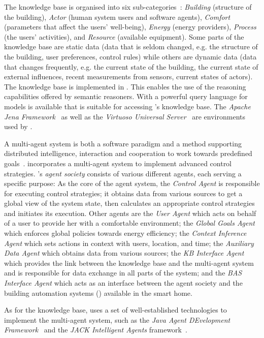 The knowledge base is organised into six sub-categories~\cite{CR2011-TH_Journal,CR2010-DEST_ThinkHome}: \emph{Building} (structure of the building), \emph{Actor} (human system users and software agents), \emph{Comfort} (parameters that affect the users' well-being), \emph{Energy} (energy providers), \emph{Process} (the users' activities), and \emph{Resource} (available equipment). Some parts of the knowledge base are static data (data that is seldom changed, e.g. the structure of the building, user preferences, control rules) while others are dynamic data (data that changes frequently, e.g. the current state of the building, the current state of external influences, recent measurements from sensors, current states of actors). The knowledge base is implemented in . This enables the use of the reasoning capabilities offered by semantic reasoners. With  a powerful query language for  models is available that is suitable for accessing \thinkhome's knowledge base.
The \emph{Apache Jena Framework}~\cite{apache_jena} as well as the \emph{Virtuoso Universal Server}~\cite{virtuoso} are environments used by \thinkhome.

A multi-agent system is both a software paradigm and a method supporting distributed intelligence, interaction and cooperation to work towards predefined goals~\cite{MultiAgentSystems}. \thinkhome incorporates a multi-agent system to implement advanced control strategies. \thinkhome's \emph{agent society} consists of various different agents, each serving a specific purpose: As the core of the agent system, the \emph{Control Agent} is responsible for executing control strategies; it obtains data from various sources to get a global view of the system state, then calculates an appropriate control strategies and initiates its execution. Other agents are the \emph{User Agent} which acts on behalf of a user to provide her with a comfortable environment; the \emph{Global Goals Agent} which enforces global policies towards energy efficiency; the \emph{Context Inference Agent} which sets actions in context with users, location, and time; the \emph{Auxiliary Data Agent} which obtains data from various sources;
the \emph{KB Interface Agent} which provides the link between the knowledge base and the multi-agent system and is responsible for data exchange in all parts of the system; and the \emph{BAS Interface Agent} which acts as an interface between the agent society and the building automation systems () available in the smart home.

As for the knowledge base, \thinkhome uses a set of well-established technologies to implement the multi-agent system, such as the \emph{Java Agent DEvelopment Framework}~\cite{jade} and the \emph{JACK Intelligent Agents} framework~\cite{jack_agents}.

